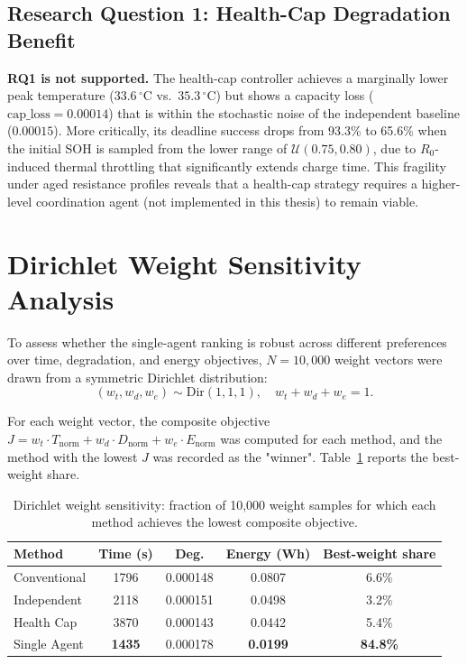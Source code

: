 \subsection{Research Question 1: Health-Cap Degradation Benefit}

\textbf{RQ1 is not supported.}  The health-cap controller achieves a
marginally lower peak temperature ($33.6\,^\circ\mathrm{C}$ vs.\
$35.3\,^\circ\mathrm{C}$) but shows a capacity loss
($\mathrm{cap\_loss} = 0.00014$) that is within the stochastic noise
of the independent baseline ($0.00015$).  More critically, its
deadline success drops from 93.3\% to 65.6\% when the initial SOH
is sampled from the lower range of $\mathcal{U}(0.75, 0.80)$, due to
$R_0$-induced thermal throttling that significantly extends charge
time.  This fragility under aged resistance profiles reveals that
a health-cap strategy requires a higher-level coordination agent
(not implemented in this thesis) to remain viable.

\section{Dirichlet Weight Sensitivity Analysis}

To assess whether the single-agent ranking is robust across
different preferences over time, degradation, and energy objectives,
$N = 10{,}000$ weight vectors were drawn from a symmetric Dirichlet
distribution:
\begin{equation}
  (w_t, w_d, w_e) \sim \mathrm{Dir}(1, 1, 1),
  \quad w_t + w_d + w_e = 1.
\end{equation}

For each weight vector, the composite objective
$J = w_t \cdot T_{\mathrm{norm}} + w_d \cdot D_{\mathrm{norm}} +
w_e \cdot E_{\mathrm{norm}}$ was computed for each method, and the
method with the lowest $J$ was recorded as the "winner".
Table~\ref{tab:weight_sensitivity} reports the best-weight share.

\begin{table}[htbp]
  \centering
  \caption{Dirichlet weight sensitivity: fraction of 10{,}000 weight
  samples for which each method achieves the lowest composite
  objective.}
  \label{tab:weight_sensitivity}
  \begin{tabular}{lcccc}
    \toprule
    \textbf{Method} & \textbf{Time (s)} & \textbf{Deg.} &
    \textbf{Energy (Wh)} & \textbf{Best-weight share} \\
    \midrule
    Conventional  & 1796 & 0.000148 & 0.0807 & 6.6\% \\
    Independent   & 2118 & 0.000151 & 0.0498 & 3.2\% \\
    Health Cap    & 3870 & 0.000143 & 0.0442 & 5.4\% \\
    Single Agent  & \textbf{1435} & 0.000178 & \textbf{0.0199} &
      \textbf{84.8\%} \\
    \bottomrule
  \end{tabular}
\end{table}

